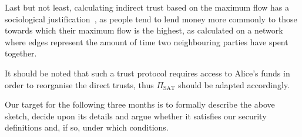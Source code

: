   Last but not least, calculating indirect trust based on the maximum flow has a
  sociological justification~\cite{jgs}, as people tend to lend money more commonly to
  those towards which their maximum flow is the highest, as calculated on a network where
  edges represent the amount of time two neighbouring parties have spent together.

  It should be noted that such a trust protocol requires access to Alice's funds in order
  to reorganise the direct trusts, thus $\Pi_{\mathrm{SAT}}$ should be adapted
  accordingly.

  Our target for the following three months is to formally describe the above sketch,
  decide upon its details and argue whether it satisfies our security definitions and, if
  so, under which conditions.
